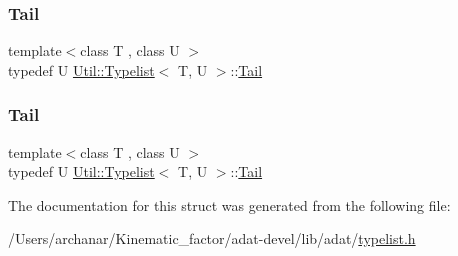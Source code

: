 \mbox{\label{structUtil_1_1Typelist_a9c02512c1b76c9340e36855f76ff5f01}} 
\subsubsection{\texorpdfstring{Tail}{Tail}\hspace{0.1cm}{\footnotesize\ttfamily [2/3]}}
{\footnotesize\ttfamily template$<$class T , class U $>$ \\
typedef U \mbox{\hyperlink{structUtil_1_1Typelist}{Util\+::\+Typelist}}$<$ T, U $>$\+::\mbox{\hyperlink{structUtil_1_1Typelist_a9c02512c1b76c9340e36855f76ff5f01}{Tail}}}

\mbox{\label{structUtil_1_1Typelist_a9c02512c1b76c9340e36855f76ff5f01}} 
\subsubsection{\texorpdfstring{Tail}{Tail}\hspace{0.1cm}{\footnotesize\ttfamily [3/3]}}
{\footnotesize\ttfamily template$<$class T , class U $>$ \\
typedef U \mbox{\hyperlink{structUtil_1_1Typelist}{Util\+::\+Typelist}}$<$ T, U $>$\+::\mbox{\hyperlink{structUtil_1_1Typelist_a9c02512c1b76c9340e36855f76ff5f01}{Tail}}}



The documentation for this struct was generated from the following file\+:\begin{DoxyCompactItemize}
\item 
/\+Users/archanar/\+Kinematic\+\_\+factor/adat-\/devel/lib/adat/\mbox{\hyperlink{adat-devel_2lib_2adat_2typelist_8h}{typelist.\+h}}\end{DoxyCompactItemize}
